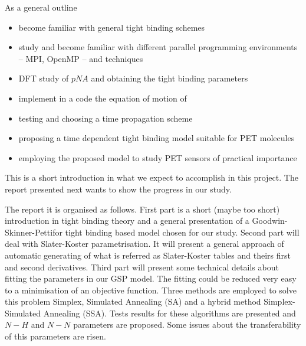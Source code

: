 \par{As a general outline}
\begin{itemize}
\item become familiar with general tight binding schemes
\item study and become familiar with different parallel programming
  environments -- MPI, OpenMP -- and techniques
\item DFT study of $pNA$ and obtaining the tight binding parameters
\item implement in a code the equation of motion of \citep{Todorov01}
\item testing and choosing a time propagation scheme
\item proposing a time dependent tight binding model suitable for PET
  molecules
\item employing the proposed model to study PET sensors of practical importance
\end{itemize}
\par{ This is a short introduction in what we expect to accomplish in this  project. The report presented next wants to show the progress in our  study.}
\par{The report it is organised as follows. First part is a short (maybe too short)
introduction in tight binding theory and a general presentation of a
Goodwin-Skinner-Pettifor tight binding based model chosen for our
study. Second part will deal with Slater-Koster parametrisation. It will
present a general approach of automatic generating of what is referred as
Slater-Koster tables and theirs first and second derivatives. Third part will
present some technical details about fitting the parameters in our GSP
model. The fitting could be reduced very easy to a minimisation of an
objective function. Three methods are employed to solve this problem Simplex,
Simulated Annealing (SA) and a hybrid method Simplex-Simulated Annealing
(SSA). Tests results for these algorithms are presented and $N-H$ and $N-N$
parameters are proposed. Some issues about the transferability of this
parameters are risen.}